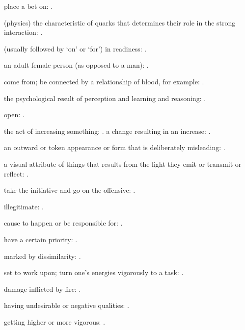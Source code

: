   place a bet on:   .

  (physics) the characteristic of quarks that determines their role in the strong interaction:   .

  (usually followed by `on' or `for') in readiness: .

  an adult female person (as opposed to a man):   .

  come from; be connected by a relationship of blood, for example:   .

  the psychological result of perception and learning and reasoning:   .

  open: .

  the act of increasing something:   . a change resulting in an increase: .

  an outward or token appearance or form that is deliberately misleading:   .

  a visual attribute of things that results from the light they emit or transmit or reflect:   .

  take the initiative and go on the offensive:   .

  illegitimate:   .

  cause to happen or be responsible for:   .

  have a certain priority: .

  marked by dissimilarity:   .

  set to work upon; turn one's energies vigorously to a task: .

  damage inflicted by fire: .

  having undesirable or negative qualities: .

  getting higher or more vigorous:   .

